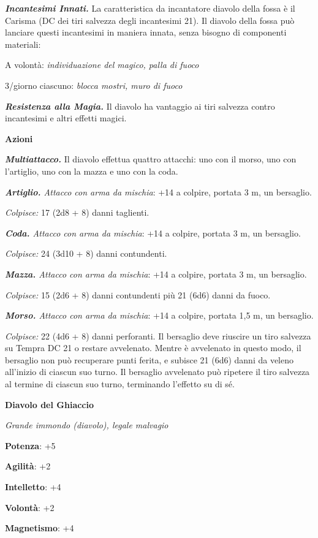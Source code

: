 \begin{multicols}{2}
\emph{\textbf{Incantesimi Innati.}} La caratteristica da incantatore
diavolo della fossa è il Carisma (DC dei tiri salvezza degli incantesimi
21). Il diavolo della fossa può lanciare questi incantesimi in maniera
innata, senza bisogno di componenti materiali:

A volontà: \emph{individuazione del magico, palla di fuoco}

3/giorno ciascuno: \emph{blocca mostri, muro di fuoco}

\emph{\textbf{Resistenza alla Magia.}} Il diavolo ha vantaggio ai tiri
salvezza contro incantesimi e altri effetti magici.

\textbf{Azioni}

\emph{\textbf{Multiattacco.}} Il diavolo effettua quattro attacchi: uno
con il morso, uno con l'artiglio, uno con la mazza e uno con la coda.

\emph{\textbf{Artiglio.} Attacco con arma da mischia}: +14 a colpire,
portata 3 m, un bersaglio.

\emph{Colpisce:} 17 (2d8 + 8) danni taglienti.

\emph{\textbf{Coda.} Attacco con arma da mischia}: +14 a colpire,
portata 3 m, un bersaglio.

\emph{Colpisce:} 24 (3d10 + 8) danni contundenti.

\emph{\textbf{Mazza.} Attacco con arma da mischia}: +14 a colpire,
portata 3 m, un bersaglio.

\emph{Colpisce:} 15 (2d6 + 8) danni contundenti più 21 (6d6) danni da
fuoco.

\emph{\textbf{Morso.} Attacco con arma da mischia}: +14 a colpire,
portata 1,5 m, un bersaglio.

\emph{Colpisce:} 22 (4d6 + 8) danni perforanti. Il bersaglio deve
riuscire un tiro salvezza su Tempra DC 21 o restare avvelenato.
Mentre è avvelenato in questo modo, il bersaglio non può recuperare
punti ferita, e subisce 21 (6d6) danni da veleno all'inizio di ciascun
suo turno. Il bersaglio avvelenato può ripetere il tiro salvezza al
termine di ciascun suo turno, terminando l'effetto su di sé.

\textbf{Diavolo del Ghiaccio}

\emph{Grande immondo (diavolo), legale malvagio}

\textbf{Potenza}: +5

\textbf{Agilità}: +2

\textbf{Intelletto}: +4

\textbf{Volontà}: +2

\textbf{Magnetismo}: +4


\end{multicols}

